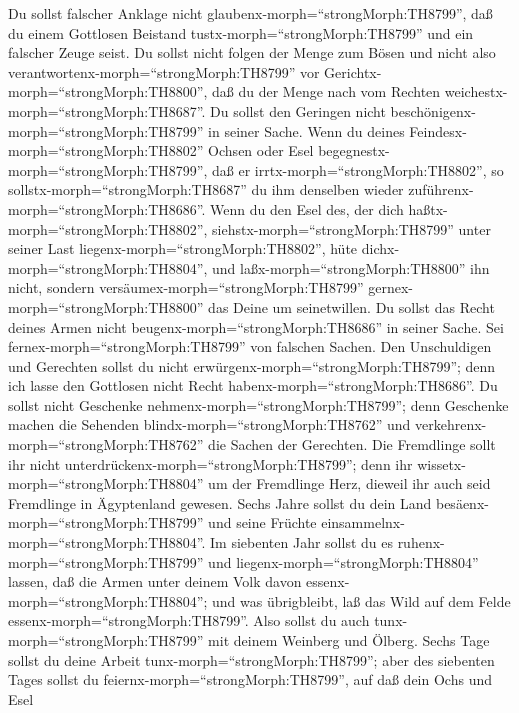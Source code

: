  Du sollst falscher Anklage nicht
glaubenx-morph=``strongMorph:TH8799'', daß du einem Gottlosen Beistand
tustx-morph=``strongMorph:TH8799'' und ein falscher Zeuge seist.
 Du sollst nicht folgen der Menge zum Bösen und nicht also
verantwortenx-morph=``strongMorph:TH8799'' vor
Gerichtx-morph=``strongMorph:TH8800'', daß du der Menge nach vom Rechten
weichestx-morph=``strongMorph:TH8687''.  Du sollst den
Geringen nicht beschönigenx-morph=``strongMorph:TH8799'' in seiner
Sache.  Wenn du deines Feindesx-morph=``strongMorph:TH8802''
Ochsen oder Esel begegnestx-morph=``strongMorph:TH8799'', daß er
irrtx-morph=``strongMorph:TH8802'', so
sollstx-morph=``strongMorph:TH8687'' du ihm denselben wieder
zuführenx-morph=``strongMorph:TH8686''.  Wenn du den Esel
des, der dich haßtx-morph=``strongMorph:TH8802'',
siehstx-morph=``strongMorph:TH8799'' unter seiner Last
liegenx-morph=``strongMorph:TH8802'', hüte
dichx-morph=``strongMorph:TH8804'', und
laßx-morph=``strongMorph:TH8800'' ihn nicht, sondern
versäumex-morph=``strongMorph:TH8799''
gernex-morph=``strongMorph:TH8800'' das Deine um seinetwillen.
 Du sollst das Recht deines Armen nicht
beugenx-morph=``strongMorph:TH8686'' in seiner Sache.  Sei
fernex-morph=``strongMorph:TH8799'' von falschen Sachen. Den
Unschuldigen und Gerechten sollst du nicht
erwürgenx-morph=``strongMorph:TH8799''; denn ich lasse den Gottlosen
nicht Recht habenx-morph=``strongMorph:TH8686''.  Du sollst
nicht Geschenke nehmenx-morph=``strongMorph:TH8799''; denn Geschenke
machen die Sehenden blindx-morph=``strongMorph:TH8762'' und
verkehrenx-morph=``strongMorph:TH8762'' die Sachen der Gerechten.
 Die Fremdlinge sollt ihr nicht
unterdrückenx-morph=``strongMorph:TH8799''; denn ihr
wissetx-morph=``strongMorph:TH8804'' um der Fremdlinge Herz, dieweil ihr
auch seid Fremdlinge in Ägyptenland gewesen.  Sechs Jahre
sollst du dein Land besäenx-morph=``strongMorph:TH8799'' und seine
Früchte einsammelnx-morph=``strongMorph:TH8804''.  Im
siebenten Jahr sollst du es ruhenx-morph=``strongMorph:TH8799'' und
liegenx-morph=``strongMorph:TH8804'' lassen, daß die Armen unter deinem
Volk davon essenx-morph=``strongMorph:TH8804''; und was übrigbleibt, laß
das Wild auf dem Felde essenx-morph=``strongMorph:TH8799''. Also sollst
du auch tunx-morph=``strongMorph:TH8799'' mit deinem Weinberg und
Ölberg.  Sechs Tage sollst du deine Arbeit
tunx-morph=``strongMorph:TH8799''; aber des siebenten Tages sollst du
feiernx-morph=``strongMorph:TH8799'', auf daß dein Ochs und Esel

